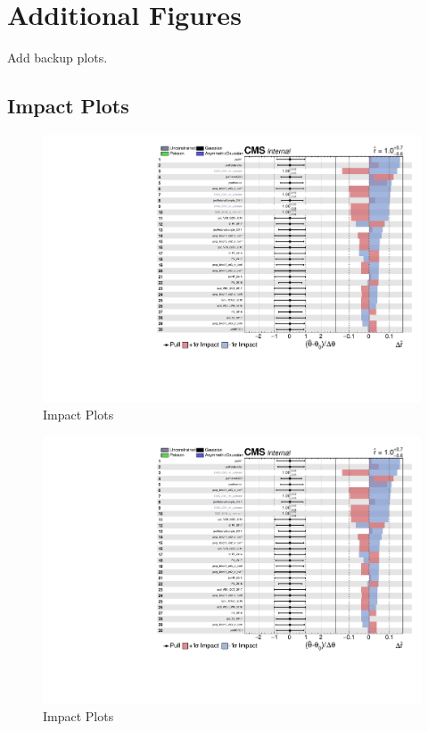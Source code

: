 \chapter{
  Additional Figures
 }

Add backup plots.

\section{
  Impact Plots
 }\label{app2:impact-plots}

\begin{figure}[!ht]
  \centering
  \includegraphics[width=\textwidth,page=3]{analysis_plots/impact_plots/impacts_datacard_run2_z.pdf}
  \caption[Impact Plots]%
  {Impact Plots}%
  \label{fig:vbs-impact-plots-page3}
\end{figure}

\begin{figure}[!ht]
  \centering
  \includegraphics[width=\textwidth,page=4]{analysis_plots/impact_plots/impacts_datacard_run2_z.pdf}
  \caption[Impact Plots]%
  {Impact Plots}%
  \label{fig:vbs-impact-plots-page4}
\end{figure}